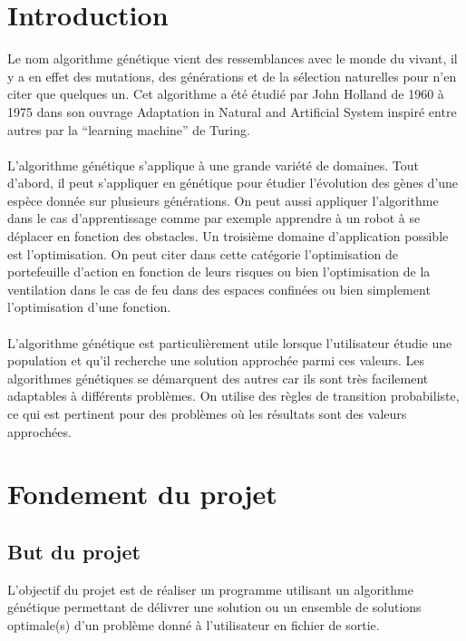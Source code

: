 \documentclass[a4paper,11pt]{article}
\title{\vspace{13em}{\huge Cahier des Charges}}
\author{Edouard Fouassier - Maxime Gonthier - Benjamin Guillot\\
		Laureline Martin - Rémi Navarro - Lydia Rodrigez de la Nava
		\vspace{2em}\\
		Algorithme Genetique
		\vspace{2em}}
\begin{document}
	
	\clearpage
	\maketitle\vspace{13em}
\newpage
\tableofcontents
\newpage\clearpage{}
	
	\section*{Introduction}
		Le nom algorithme génétique vient des ressemblances avec le monde du vivant, il y a en effet des mutations, des générations et de la sélection naturelles pour n’en citer que quelques un. 
		Cet algorithme a été étudié par John Holland de 1960 à 1975 dans son ouvrage Adaptation in Natural and Artificial System inspiré entre autres par la “learning machine” de Turing.\\
		\\
		L’algorithme génétique s’applique à une grande variété de domaines. 
		Tout d’abord, il peut s’appliquer en génétique pour étudier l’évolution des gènes d’une espèce donnée sur plusieurs générations. 
		On peut aussi appliquer l’algorithme dans le cas d’apprentissage comme par exemple apprendre à un robot à se déplacer en fonction des obstacles. 
		Un troisième domaine d’application possible est l’optimisation. 
		On peut citer dans cette catégorie l’optimisation de portefeuille d'action en fonction de leurs risques ou bien l’optimisation de la ventilation dans le cas de feu dans des espaces confinées ou bien simplement l’optimisation d’une fonction.\\ 
		\\
		L’algorithme génétique est particulièrement utile lorsque l’utilisateur étudie une population et qu’il recherche une solution approchée parmi ces valeurs. 
		Les algorithmes génétiques se démarquent des autres car ils sont très facilement adaptables à différents problèmes. 
		On utilise des règles de transition probabiliste, ce qui est pertinent pour des problèmes où les résultats sont des valeurs approchées.\\

	\section{Fondement du projet}
		\subsection{But du projet}
			L'objectif du projet est de réaliser un programme utilisant un algorithme génétique permettant de délivrer une solution ou un ensemble de solutions optimale(s) d’un problème donné à l’utilisateur en fichier de sortie.
		
\end{document}
